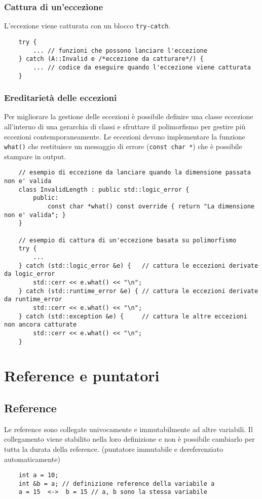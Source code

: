 \documentclass[a4paper]{article}
\begin{document}
\subsubsection*{Cattura di un'eccezione}
L'eccezione viene catturata con un blocco \verb|try-catch|.
\begin{lstlisting}
	try {
		... // funzioni che possono lanciare l'eccezione
	} catch (A::Invalid e /*eccezione da catturare*/) {
		... // codice da eseguire quando l'eccezione viene catturata
	}
\end{lstlisting}

\subsubsection*{Ereditarietà delle eccezioni}
Per migliorare la gestione delle eccezioni è possibile definire una classe eccezione all'interno di una gerarchia di classi e
sfruttare il polimorfismo per gestire più eccezioni contemporaneamente. Le eccezioni devono implementare la funzione \verb|what()|
che restituisce un messaggio di errore (\verb|const char *|) che è possibile stampare in output.
\begin{lstlisting}
	// esempio di eccezione da lanciare quando la dimensione passata non e' valida
	class InvalidLength : public std::logic_error {
		public:
			const char *what() const override {	return "La dimensione non e' valida"; }
	}

	// esempio di cattura di un'eccezione basata su polimorfismo
	try {
		...
	} catch (std::logic_error &e) {   // cattura le eccezioni derivate da logic_error
		std::cerr << e.what() << "\n";
	} catch (std::runtime_error &e) { // cattura le eccezioni derivate da runtime_error
		std::cerr << e.what() << "\n";
	} catch (std::exception &e) {     // cattura le altre eccezioni non ancora catturate
		std::cerr << e.what() << "\n";
	}
\end{lstlisting}

\newpage

\section{Reference e puntatori}
\subsection{Reference}
Le reference sono  collegate univocamente e immutabilmente ad altre variabili. Il collegamento viene stabilito
nella loro definizione e non è possibile cambiarlo per tutta la durata della reference. (puntatore immutabile e dereferenziato
automaticamente)
\begin{lstlisting}
	int a = 10;
	int &b = a; // definizione reference della variabile a
	a = 15  <->  b = 15 // a, b sono la stessa variabile
\end{lstlisting}
\end{document}
